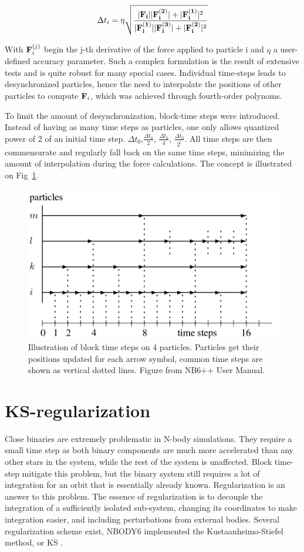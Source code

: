 \begin{equation}
\label{Eq:0_timestep}
\Delta t_i =  \eta \sqrt{\frac{ |\bold{F_i}||\bold{F^{(2)}_i}| + |\bold{F^{(1)}_i}|^2 }{|\bold{F^{(1)}_i}||\bold{F^{(3)}_i}| + |\bold{F^{(2)}_i}|^2}}
\end{equation}
 
With $\bold{F}^{(j)}_i$ begin the j-th derivative of the force applied to particle i and $\eta$ a user-defined accuracy parameter. Such a complex formulation is the result of extensive tests and is quite robust for many special cases. Individual time-steps leads to desynchronized particles, hence the need to interpolate the positions of other particles to compute $\bold{F}_i$, which was achieved through fourth-order polynoms.
 
 To limit the amount of desynchronization, block-time steps were introduced. Instead of having as many time steps as particles, one only allows quantized power of 2 of an initial time step. $\Delta t_0$,$\frac{\Delta t_0}{2}$, $\frac{\Delta t_0}{4}$, $\frac{\Delta t_0}{2^i}$. All time steps are then commensurate and regularly fall back on the same time steps, minimizing the amount of interpolation during the force calculations. The concept is illustrated on Fig~\ref{Fig:0_blocktimesteps}.
 
\begin{figure}

\center
\includegraphics[width=0.6\linewidth]{Figures/0_block_timesteps.png}
\caption{Illustration of block time steps on 4 particles. Particles get their positions updated for each arrow symbol, common time steps are shown as vertical dotted lines. Figure from NB6++ User Manual. }
\label{Fig:0_blocktimesteps}
\end{figure} 
 
 
\section{KS-regularization}

Close binaries are extremely problematic in N-body simulations. They require a small time step as both binary components are much more accelerated than any other stars in the system, while the rest of the system is unaffected. Block time-step mitigate this problem, but the binary system still requires a lot of integration for an orbit that is essentially already known. Regularization is an answer to this problem. The essence of regularization is to decouple the integration of a sufficiently isolated sub-system, changing its coordinates to make integration easier, and including perturbations from external bodies. Several regularization scheme exist, NBODY6 implemented the Kustaanheimo-Stiefel method, or KS \citep{KS1965}.

